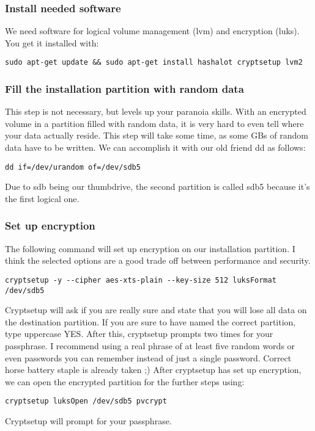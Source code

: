 \documentclass[12pt,a4paper]{article}
\begin{document}
\subsubsection{Install needed software}
We need software for logical volume management (lvm) and encryption (luks). You get it installed with:
\begin{Verbatim}[commandchars=\\\{\}]
sudo apt-get update && sudo apt-get install hashalot cryptsetup lvm2
\end{Verbatim}

\subsubsection{Fill the installation partition with random data}
This step is not necessary, but levels up your paranoia skills. With an encrypted volume in a partition filled with random data, it is very hard to even tell where your data actually reside. This step will take some time, as some GBs of random data have to be written. We can accomplish it with our old friend dd as follows:
\begin{Verbatim}[commandchars=\\\{\}]
dd if=/dev/urandom of=/dev/sdb5
\end{Verbatim}
Due to sdb being our thumbdrive, the second partition is called sdb5 because it's the first logical one.

\subsubsection{Set up encryption}
The following command will set up encryption on our installation partition. I think the selected options are a good trade off between performance and security.
\begin{Verbatim}[commandchars=\\\{\}]
cryptsetup -y --cipher aes-xts-plain --key-size 512 luksFormat /dev/sdb5
\end{Verbatim}
Cryptsetup will ask if you are really sure and state that you will lose all data on the destination partition. If you are sure to have named the correct partition, type uppercase YES. After this, cryptsetup prompts two times for your passphrase. I recommend using a real phrase of at least five random words or even passwords you can remember instead of just a single password. Correct horse battery staple is already taken ;) After cryptsetup has set up encryption, we can open the encrypted partition for the further steps using:
\begin{Verbatim}[commandchars=\\\{\}]
cryptsetup luksOpen /dev/sdb5 pvcrypt
\end{Verbatim}
Cryptsetup will prompt for your passphrase.
\end{document}
